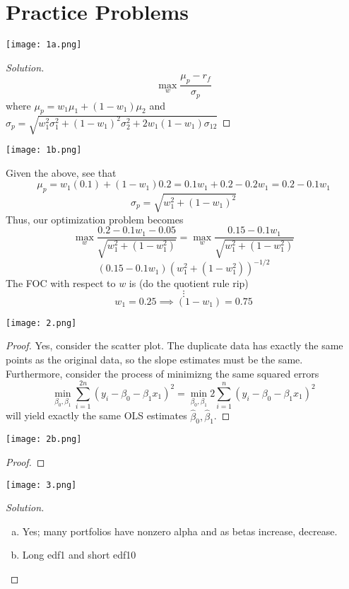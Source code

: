 \documentclass[12pt]{scrartcl}
\begin{document}
\section{Practice Problems}

\texttt{[image: 1a.png]}

\begin{proof}[Solution]
  \[\max_w \dfrac{\mu_p - r_f}{\sigma_p}\]
  where $\mu_p = w_1\mu_1 + (1-w_1)\mu_2$ and $\sigma_p = \sqrt{w_1^2\sigma_1^2 + (1-w_1)^2\sigma_2^2 + 2w_1(1-w_1)\sigma_{12}}$
\end{proof}

\texttt{[image: 1b.png]}

Given the above, see that 
\[\mu_p = w_1(0.1) + (1-w_1)0.2 = 0.1w_1 + 0.2 -0.2w_1 = 0.2 - 0.1w_1\]
\[\sigma_p = \sqrt{w_1^2 + (1-w_1)^2}\]
Thus, our optimization problem becomes 
\[\max_w \dfrac{0.2 - 0.1w_1 - 0.05}{\sqrt{w_1^2 + (1-w_1^2)}} = \max_w \dfrac{0.15 - 0.1w_1}{\sqrt{w_1^2 + (1-w_1^2)}}\]
\[(0.15 - 0.1w_1)(w_1^2 + (1-w_1^2))^{-1/2}\]
The FOC with respect to $w$ is (do the quotient rule rip)
\[\vdots\]
\[w_1 = 0.25 \implies (1-w_1) = 0.75\]

\texttt{[image: 2.png]}

\begin{proof}
  Yes, consider the scatter plot. The duplicate data has exactly the same points 
  as the original data, so the slope estimates must be the same. Furthermore, 
  consider the process of minimizng the same squared errors 
  \[\min_{\beta_0, \beta_1} \sum_{i=1}^{2n}(y_i - \beta_0 - \beta_1 x_1)^2 = \min_{\beta_0, \beta_1} 2\sum_{i=1}^n (y_i - \beta_0 - \beta_1 x_1)^2\]
  will yield exactly the same OLS estimates $\hat{\beta}_0, \hat{\beta}_1$.
\end{proof}

\texttt{[image: 2b.png]}

\begin{proof}
  
\end{proof}

\texttt{[image: 3.png]}

\begin{proof}[Solution]

  \hfill

  \begin{enumerate}[a.]
    \item Yes; many portfolios have nonzero alpha and as betas increase, 
    decrease.
    \item Long edf1 and short edf10
  \end{enumerate}
\end{proof}
\end{document}
